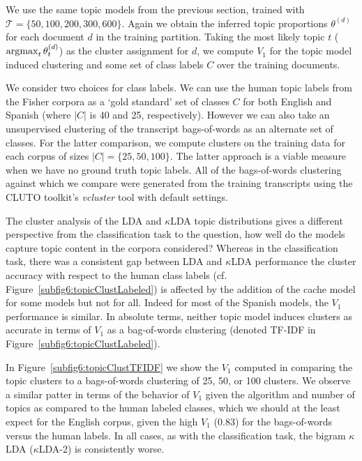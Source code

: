 We use the same topic models from the previous section, trained with $\mathcal{T} = \{50,100,200,300,600\}$. Again we obtain the inferred topic proportions $\theta^{(d)}$ for each document $d$ in the training partition.  Taking the most likely topic $t$ ($\operatorname*{\arg\!\max}_t \theta^{(d)}_t$) as the cluster assignment for $d$, we compute $V_{1}$ for the topic model induced clustering and some set of class labels $C$ over the training documents.

We consider two choices for class labels.  We can use the human topic labels from the Fisher corpora as a `gold standard' set of classes $C$ for both English and Spanish (where $|C|$ is 40 and 25, respectively).  However we can also take an unsupervised clustering of the transcript bags-of-words as an alternate set of classes.  For the latter comparison, we compute clusters on the training data for each corpus of sizes $|C|=\{25,50,100\}$.  The latter approach is a viable measure when we have no ground truth topic labels.  All of the bags-of-words clustering against which we compare were generated from the training transcripts using the CLUTO toolkit's \cite{cluto} \textit{vcluster} tool with default settings.%

The cluster analysis of the LDA and $\kappa$LDA topic distributions gives a different perspective from the classification task to the question, how well do the models capture topic content in the corpora considered?  Whereas in the classification task, there was a consistent gap between LDA and $\kappa$LDA performance the cluster accuracy with respect to the human class labels (cf. Figure~\ref{subfig6:topicClustLabeled}) is affected by the addition of the cache model for some models but not for all.  Indeed for most of the Spanish models, the $V_1$ performance is similar.  In absolute terms, neither topic model induces clusters as accurate in terms of $V_1$ as a bag-of-words clustering (denoted TF-IDF in Figure~\ref{subfig6:topicClustLabeled}).  

In Figure~\ref{subfig6:topicClustTFIDF} we show the $V_1$ computed in comparing the topic clusters to a bags-of-words clustering of 25, 50, or 100 clusters.  We observe a similar patter in terms of the behavior of $V_1$ given the algorithm and number of topics as compared to the human labeled classes, which we should at the least expect for the English corpus, given the high $V_1$ (0.83) for the bags-of-words versus the human labels.  In all cases, as with the classification task, the bigram $\kappa$LDA ($\kappa$LDA-2) is consistently worse.  

